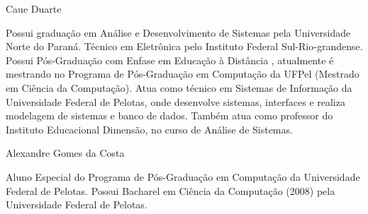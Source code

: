 \documentclass[12pt,a4paper,compsoc]{IEEEtran}
\begin{document}





\begin{IEEEbiography}{Caue Duarte}

  Possui graduação em Análise e Desenvolvimento de Sistemas pela Universidade Norte do Paraná.
  Técnico em Eletrônica pelo Instituto Federal Sul-Rio-grandense. Possui Pós-Graduação com Enfase
  em Educação à Distância , atualmente é mestrando no Programa de Pós-Graduação em Computação da
  UFPel (Mestrado em Ciência da Computação). Atua como técnico em Sistemas de Informação da
  Universidade Federal de Pelotas, onde desenvolve sistemas, interfaces e realiza modelagem de
  sistemas e banco de dados. Também atua como professor do Instituto Educacional Dimensão, no
  curso de Análise de Sistemas. 
\end{IEEEbiography}

\begin{IEEEbiography}{Alexandre Gomes da Costa}

  Aluno Especial do Programa de Pós-Graduação em Computação da Universidade Federal de Pelotas. Possui
  Bacharel em Ciência da Computação (2008) pela Universidade Federal de Pelotas.
  
\end{IEEEbiography}
\end{document}
